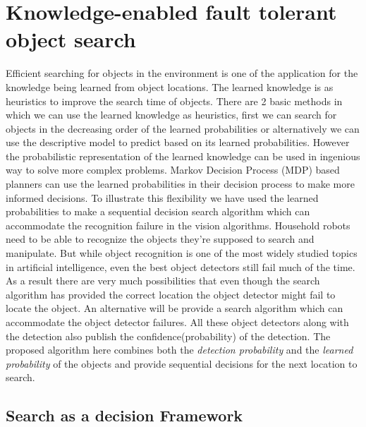 \documentclass[11pt]{book}
\begin{document}

%


\chapter{Knowledge-enabled fault tolerant object search}
\label{cha}

Efficient searching for objects in the environment is one of the application for the knowledge being learned from object locations. The learned knowledge is as heuristics to improve the search time of objects. There are 2 basic methods in which we can use the learned knowledge as heuristics, first we can search for objects in the decreasing order of the learned probabilities or alternatively we can use the descriptive model to predict based on its learned probabilities. However the probabilistic representation of the learned knowledge can be used in ingenious way to solve more complex problems. Markov Decision Process (MDP) based planners can use the learned probabilities in their decision process to make more informed decisions. To illustrate this flexibility we have used the learned probabilities to make a sequential decision search algorithm which can accommodate the recognition failure in the vision algorithms.
Household robots need to be able to recognize the objects they’re supposed to search and manipulate. But while object recognition is one of the most widely studied topics in artificial intelligence, even the best object detectors still fail much of the time. As a result there are very much possibilities that even though the search algorithm has provided the correct location the object detector might fail to locate the object. An alternative will be provide a search algorithm which can accommodate the object detector failures. All these object detectors along with the detection also publish the confidence(probability) of the detection. The proposed algorithm here combines both the \emph{detection probability} and the \emph{learned probability} of the objects and provide sequential decisions for the next location to search.

\section{Search as a decision Framework}
\end{document}
